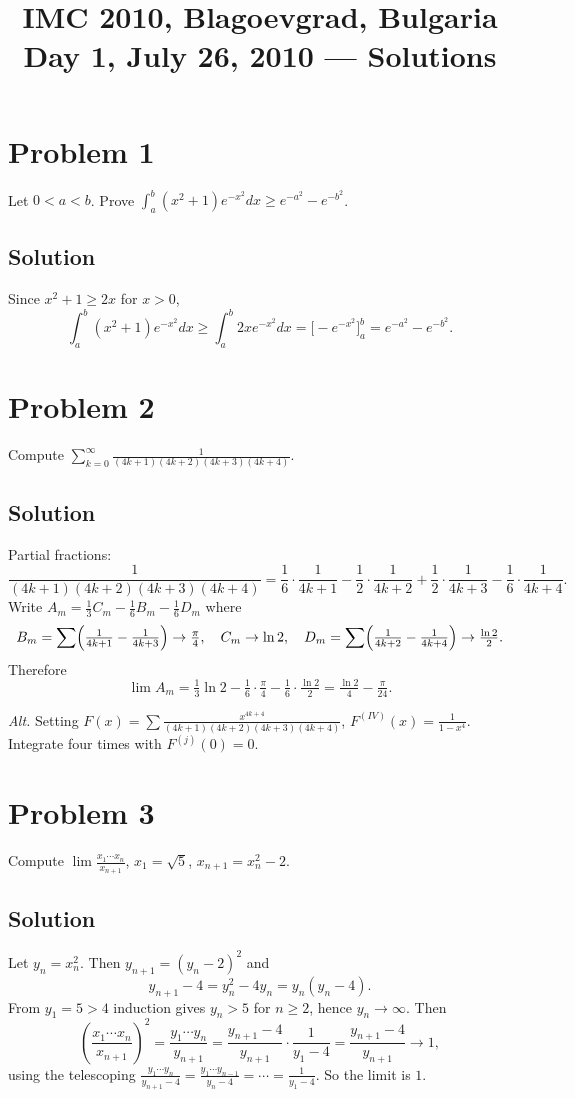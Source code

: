\documentclass{article}
\title{IMC 2010, Blagoevgrad, Bulgaria \\ Day 1, July 26, 2010 --- Solutions}
\date{}
\begin{document}
\maketitle

\section*{Problem 1}
Let $0 < a < b$. Prove $\int_a^b (x^2 + 1) e^{-x^2} dx \ge e^{-a^2} - e^{-b^2}$.

\subsection*{Solution}
Since $x^2 + 1 \ge 2x$ for $x > 0$,
\[
\int_a^b (x^2 + 1) e^{-x^2} dx \ge \int_a^b 2x e^{-x^2} dx = \bigl[-e^{-x^2}\bigr]_a^b = e^{-a^2} - e^{-b^2}.
\]

\section*{Problem 2}
Compute $\sum_{k=0}^\infty \tfrac{1}{(4k+1)(4k+2)(4k+3)(4k+4)}$.

\subsection*{Solution}
Partial fractions:
\[
\frac{1}{(4k+1)(4k+2)(4k+3)(4k+4)} = \frac{1}{6}\cdot\frac{1}{4k+1} - \frac{1}{2}\cdot\frac{1}{4k+2} + \frac{1}{2}\cdot\frac{1}{4k+3} - \frac{1}{6}\cdot\frac{1}{4k+4}.
\]
Write $A_m = \tfrac{1}{3} C_m - \tfrac{1}{6} B_m - \tfrac{1}{6} D_m$ where
\[
B_m = \sum \Bigl(\tfrac{1}{4k+1} - \tfrac{1}{4k+3}\Bigr) \to \tfrac{\pi}{4}, \quad C_m \to \ln 2, \quad D_m = \sum\Bigl(\tfrac{1}{4k+2} - \tfrac{1}{4k+4}\Bigr) \to \tfrac{\ln 2}{2}.
\]
Therefore
\[
\lim A_m = \tfrac{1}{3}\ln 2 - \tfrac{1}{6}\cdot \tfrac{\pi}{4} - \tfrac{1}{6}\cdot\tfrac{\ln 2}{2} = \boxed{\tfrac{\ln 2}{4} - \tfrac{\pi}{24}}.
\]

\emph{Alt.} Setting $F(x) = \sum \tfrac{x^{4k+4}}{(4k+1)(4k+2)(4k+3)(4k+4)}$, $F^{(IV)}(x) = \tfrac{1}{1-x^4}$. Integrate four times with $F^{(j)}(0) = 0$.

\section*{Problem 3}
Compute $\lim \tfrac{x_1 \cdots x_n}{x_{n+1}}$, $x_1 = \sqrt 5$, $x_{n+1} = x_n^2 - 2$.

\subsection*{Solution}
Let $y_n = x_n^2$. Then $y_{n+1} = (y_n - 2)^2$ and
\[
y_{n+1} - 4 = y_n^2 - 4 y_n = y_n(y_n - 4).
\]
From $y_1 = 5 > 4$ induction gives $y_n > 5$ for $n \ge 2$, hence $y_n \to \infty$. Then
\[
\left(\frac{x_1 \cdots x_n}{x_{n+1}}\right)^2 = \frac{y_1 \cdots y_n}{y_{n+1}} = \frac{y_{n+1} - 4}{y_{n+1}} \cdot \frac{1}{y_1 - 4} = \frac{y_{n+1} - 4}{y_{n+1}} \to 1,
\]
using the telescoping $\tfrac{y_1 \cdots y_n}{y_{n+1} - 4} = \tfrac{y_1 \cdots y_{n-1}}{y_n - 4} = \cdots = \tfrac{1}{y_1 - 4}$. So the limit is $1$.
\end{document}
